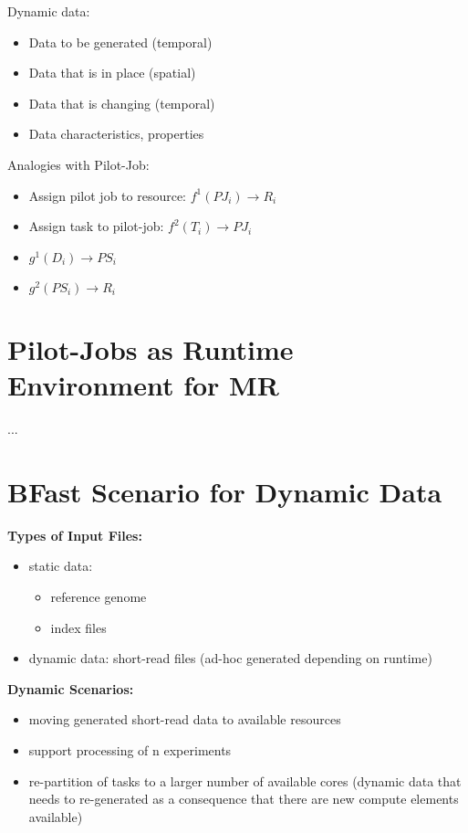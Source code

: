 \documentclass[]{article}
\begin{document}
\noindent	
Dynamic data:
\begin{itemize}
	\item Data to be generated (temporal)
	\item Data that is in place (spatial)
	\item Data that is changing (temporal)
	\item Data characteristics, properties
\end{itemize}	

\noindent
Analogies with Pilot-Job:
\begin{itemize}
	\item Assign pilot job to resource: $f^{1}(PJ_i) \rightarrow R_i$
	\item Assign task to pilot-job: $f^{2}(T_i) \rightarrow PJ_i$ 

	\item $g^{1} (D_i) \rightarrow PS_i$
	\item $g^{2} (PS_i) \rightarrow R_i$
\end{itemize}

\section{Pilot-Jobs as Runtime Environment for MR}
...


\section{BFast Scenario for Dynamic Data}

\textbf{Types of Input Files:}
\begin{itemize}
	\item static data: 
	\begin{itemize}
		\item reference genome
		\item index files
	\end{itemize}
	\item dynamic data: short-read files (ad-hoc generated depending on runtime)
\end{itemize}

\noindent
\textbf{Dynamic Scenarios:}
\begin{itemize}
	\item moving generated short-read data to available resources
	
	\item support processing of n experiments 

	\item re-partition of tasks to a larger number of available cores (dynamic data that needs to re-generated as a consequence that there are new compute elements available)

\end{itemize}



\end{document}
